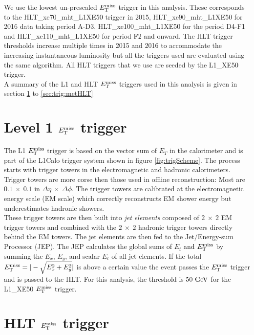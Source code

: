 \indent We use the lowest un-prescaled $E_{\mathrm{T}}^{\mathrm{miss}}$ trigger in this analysis.  These corresponds to the {\sc HLT\_xe70\_mht\_L1XE50} trigger in 2015,  {\sc HLT\_xe90\_mht\_L1XE50} for 2016 data taking period A-D3, {\sc HLT\_xe100\_mht\_L1XE50} for the period D4-F1 and {\sc HLT\_xe110\_mht\_L1XE50} for period F2 and onward. The HLT trigger thresholds increase multiple times in 2015 and 2016 to accommodate the increasing instantaneous luminosity but all the triggers used are evaluated using the same algorithm.  All HLT triggers that we use are seeded by the L1\_XE50 trigger. \\

\indent A summary of the L1 and HLT $E_{\mathrm{T}}^{\mathrm{miss}}$ triggers used in this analysis is given in section \ref{sec:trig:L1Calo} to \ref{sec:trig:metHLT}\\

\section{Level 1 $E_{\mathrm{T}}^{\mathrm{miss}}$ trigger}
\label{sec:trig:L1Calo}

\indent The L1 $E_{\mathrm{T}}^{\mathrm{miss}}$ trigger is based on the vector sum of $E_T$ in the calorimeter and is part of the L1Calo trigger system \cite{L1Calo} shown in figure \ref{fig:trigScheme}.  The process starts with trigger towers in the electromagnetic and hadronic calorimeters.  Trigger towers are more corse then those used in offline reconstruction: Most are $0.1~\times~0.1$ in $\Delta\eta~\times~\Delta\phi$.  The trigger towers are calibrated at the electromagnetic energy scale (EM scale) which correctly reconstructs EM shower energy but underestimates hadronic showers.  \\

\indent These trigger towers are then built into {\it jet elements} composed of $2~\times~2$ EM trigger towers and combined with the $2~\times~2$ hadronic trigger towers directly behind the EM towers. The jet elements are then fed to the Jet/Energy-sum Processor (JEP).  The JEP calculates the global sums of $E_t$ and $E_{\mathrm{T}}^{\mathrm{miss}}$ by summing the $E_x$, $E_y$, and scalar $E_t$ of all jet elements.  If the total $E_{\mathrm{T}}^{\mathrm{miss}} = |- \sqrt{E_x^2+E_y^2}|$ is above a certain value the event passes the $E_{\mathrm{T}}^{\mathrm{miss}}$ trigger and is passed to the HLT.  For this analysis, the threshold is $50 \gev$ for the L1\_XE50 $E_{\mathrm{T}}^{\mathrm{miss}}$ trigger. \\

\section{HLT $E_{\mathrm{T}}^{\mathrm{miss}}$ trigger}
\label{sec:trig:HLT_MET}

